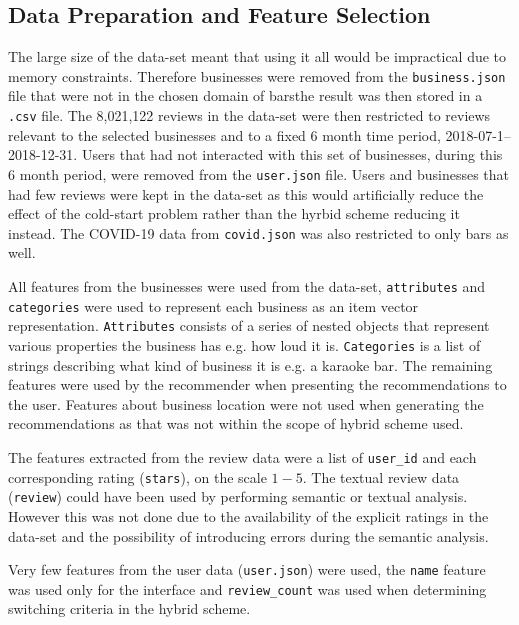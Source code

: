 \documentclass[conference]{IEEEtran}
\begin{document}
\subsection{Data Preparation and Feature Selection}
The large size of the data-set meant that using it all would be impractical due to memory constraints. Therefore businesses were removed from the \texttt{business.json} file that were not in the chosen domain of bars\textemdash the result was then stored in a \texttt{.csv} file. The 8,021,122 reviews in the data-set were then restricted to reviews relevant to the selected businesses and to a fixed 6 month time period, 2018-07-1--2018-12-31. Users that had not interacted with this set of businesses, during this 6 month period, were removed from the \texttt{user.json} file. Users and businesses that had few reviews were kept in the data-set as this would artificially reduce the effect of the cold-start problem rather than the hyrbid scheme reducing it instead. The COVID-19 data from \texttt{covid.json} was also restricted to only bars as well.
\par
All features from the businesses were used from the data-set, \texttt{attributes} and \texttt{categories} were used to represent each business as an item vector representation. \texttt{Attributes} consists of a series of nested objects that represent various properties the business has e.g. how loud it is. \texttt{Categories} is a list of strings describing what kind of business it is e.g. a karaoke bar. The remaining features were used by the recommender when presenting the recommendations to the user. Features about business location were not used when generating the recommendations as that was not within the scope of hybrid scheme used.
\par
The features extracted from the review data were a list of \texttt{user\_id} and each corresponding rating (\texttt{stars}), on the scale $1-5$. The textual review data (\texttt{review}) could have been used by performing semantic or textual analysis\cite{b10}. However this was not done due to the availability of the explicit ratings in the data-set and the possibility of introducing errors during the semantic analysis\cite{b11}.
\par
Very few features from the user data (\texttt{user.json}) were used, the \texttt{name} feature was used only for the interface and \texttt{review\_count} was used when determining switching criteria in the hybrid scheme.
\end{document}
